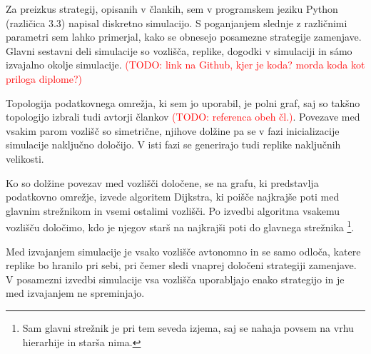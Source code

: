 \documentclass[a4paper, 12pt]{book}
\newcommand{\TODO}[1]{\textcolor{red}{(TODO: #1)}}
\begin{document}
Za preizkus strategij, opisanih v člankih, sem v programskem jeziku Python
(različica 3.3) napisal diskretno simulacijo. S poganjanjem slednje z
različnimi parametri sem lahko primerjal, kako se obnesejo posamezne strategije
zamenjave. Glavni sestavni deli simulacije so vozlišča, replike, dogodki v
simulaciji in sámo izvajalno okolje simulacije.
\TODO{link na Github, kjer je koda? morda koda kot priloga diplome?}

Topologija podatkovnega omrežja, ki sem jo uporabil, je polni graf, saj so
takšno topologijo izbrali tudi avtorji člankov \TODO{referenca obeh čl.}.
Povezave med vsakim parom vozlišč so simetrične, njihove dolžine pa se v fazi
inicializacije simulacije naključno določijo. V isti fazi se generirajo tudi
replike naključnih velikosti.

Ko so dolžine povezav med vozlišči določene, se na grafu, ki predstavlja
podatkovno omrežje, izvede algoritem Dijkstra, ki poišče najkrajše poti med
glavnim strežnikom in vsemi ostalimi vozlišči. Po izvedbi algoritma vsakemu
vozlišču določimo, kdo je njegov starš na najkrajši poti do glavnega strežnika%
\footnote{Sam glavni strežnik je pri tem seveda izjema, saj se nahaja povsem
na vrhu hierarhije in starša nima.}.

Med izvajanjem simulacije je vsako vozlišče avtonomno in se samo odloča, katere
replike bo hranilo pri sebi, pri čemer sledi vnaprej določeni strategiji
zamenjave. V posamezni izvedbi simulacije vsa vozlišča uporabljajo enako
strategijo in je med izvajanjem ne spreminjajo.
\end{document}
